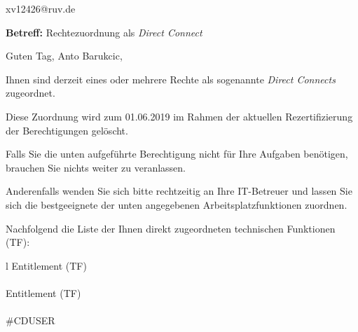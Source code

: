 \documentclass[a4paper,landscape,12pt]{letter}
\begin{document}
\begin{letter}{xv12426@ruv.de\hfill \break}
\begin{normalsize}
	\opening{\textbf{Betreff:} Rechtezuordnung als \emph{Direct Connect}}
	\begin{normalsize} \hfill
	\end{normalsize}

	\begin{normalsize}
		Guten Tag, 
	Anto Barukcic, \hfill \break
	\end{normalsize}
	\end{normalsize}
	
\begin{normalsize}
	Ihnen sind derzeit eines oder mehrere Rechte als sogenannte \emph{Direct Connects} zugeordnet.
	
	Diese Zuordnung wird zum 01.06.2019 im Rahmen der aktuellen Rezertifizierung der Berechtigungen gelöscht.
	
	Falls Sie die unten aufgeführte Berechtigung nicht für Ihre Aufgaben benötigen, 
	brauchen Sie nichts weiter zu veranlassen.
	
	Anderenfalls wenden Sie sich bitte rechtzeitig an Ihre IT-Betreuer 
	und lassen Sie sich die bestgeeignete der unten angegebenen Arbeitsplatzfunktionen zuordnen.
	\end{normalsize}
	
\begin{normalsize}
	Nachfolgend die Liste der Ihnen direkt zugeordneten technischen Funktionen (TF):

	\begin{longtable}{l}
		Entitlement (TF) \\ \hline
		\endfirsthead
		\\\hline
		Entitlement (TF) \\ \hline
		\endhead %
		\multicolumn{1}{r@{}}{Fortsetzung \ldots}\\
		\endfoot
		\hline
		\endlastfoot
	\#CDUSER\\
	\end{longtable}
	\end{normalsize}
	

\end{letter}
\end{document}
